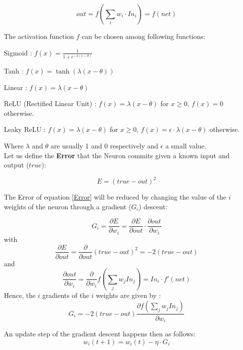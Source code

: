 \documentclass[10pt,a4paper]{article}
\begin{document}
\begin{equation}\label{out}
out = f(\sum_{i}{w_i \cdot In_i}) = f(net)
\end{equation}

The activation function $f$ can be chosen among following functions: 

\begin{list}{•}{}
\item Sigmoid :  $ f(x) = \frac{1}{1 + e^{-\lambda(x - \theta)}} $
\item Tanh : $ f(x) = \tanh(\lambda(x - \theta)) $
\item Linear : $ f(x) = \lambda(x - \theta) $
\item ReLU (Rectified Linear Unit) : $ f(x) = \lambda(x - \theta)$ for $ x \geqslant 0 $, $ f(x) = 0 $ otherwise.
\item Leaky ReLU : $ f(x) = \lambda(x - \theta)$ for $ x \geqslant 0 $, $ f(x) = \epsilon \cdot \lambda(x - \theta) $ otherwise.
\end{list}

Where $\lambda$ and $\theta$ are usually 1 and 0 respectively and $\epsilon$ a small value. \\

Let us define the \textbf{Error} that the Neuron commits given a known input and output ($true$): 

\begin{equation}\label{Error}
E = (true - out)^2 
\end{equation}

The Error of equation \ref{Error} will be reduced by changing the value of the $i$ weights of the neuron through a gradient ($G_i$) descent: 

\[
G_i = \frac{\partial E }{\partial w_i} = \frac{\partial E }{\partial out} \cdot \frac{\partial out }{\partial w_i}
\]
with
$$
\frac{\partial E }{\partial out} = \frac{\partial}{\partial out}(true - out)^2 = -2(true - out)
$$ 
and 
$$
\frac{\partial out }{\partial w_i} = \frac{\partial}{\partial w_i}f(\sum_{j}w_j In_j) = In_i \cdot f'(net)
$$
Hence, the $i$ gradients of the $i$ weights are given by :
\begin{equation}\label{Gradient}
\boxed{G_i = -2(true - out)\frac{\partial f(\sum_{j}w_j In_j)}{\partial w_i}}
\end{equation}

An update step of the gradient descent happens then as follows: 
\begin{equation}\label{Update}
\boxed{w_i(t+1) = w_i(t) - \eta \cdot G_i}
\end{equation}
\end{document}
